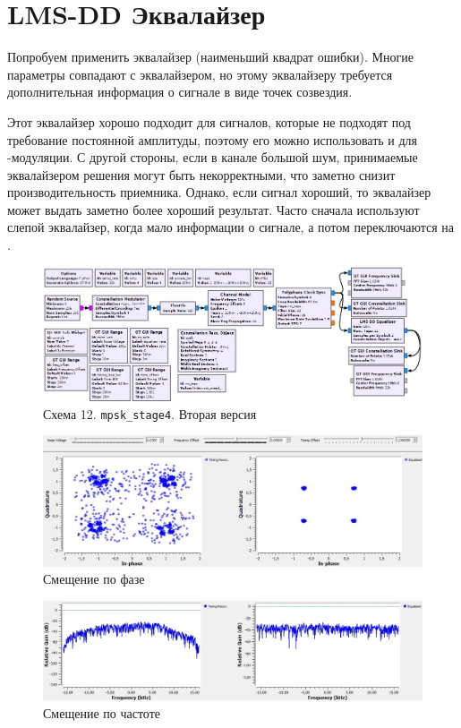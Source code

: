 \documentclass[a4paper, 12pt]{report}
\begin{document}
	\chapter{LMS-DD Эквалайзер}
	Попробуем применить  эквалайзер (наименьший квадрат ошибки). Многие параметры совпадают с  эквалайзером, но этому эквалайзеру требуется дополнительная информация о сигнале в виде точек созвездия.
	 
	Этот эквалайзер хорошо подходит для сигналов, которые не подходят под требование постоянной амплитуды, поэтому его можно использовать и для -модуляции. С другой стороны, если в канале большой шум, принимаемые эквалайзером решения могут быть некорректными, что заметно снизит производительность приемника. Однако, если сигнал хороший, то  эквалайзер может выдать заметно более хороший результат. Часто сначала используют слепой эквалайзер, когда мало информации о сигнале, а потом переключаются на .
	\begin{figure}[H]
		\centering
		\includegraphics[width=1.0\textwidth]{32.jpg}
		\caption{Схема 12. \texttt{mpsk\_stage4}. Вторая версия}
		\label{fig:32}
	\end{figure}
	\begin{figure}[H]
		\centering
		\includegraphics[width=1.0\textwidth]{33.jpg}
		\caption{Смещение по фазе}
		\label{fig:33}
	\end{figure}
	\begin{figure}[H]
		\centering
		\includegraphics[width=1.0\textwidth]{34.jpg}
		\caption{Смещение по частоте}
		\label{fig:34}
	\end{figure}
\end{document}
